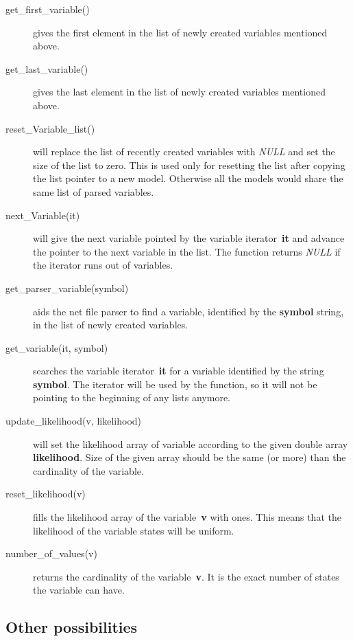 \documentclass[12pt,a4paper]{report}
\begin{document}
\begin{description}
\item[get_first_variable()] gives the first element in the list
of newly created variables mentioned above.

\item[get_last_variable()] gives the last element in the list
of newly created variables mentioned above.

\item[reset_Variable_list()] will replace the list of recently created
variables with {\it NULL} and set the size of the list to zero. This
is used only for resetting the list after copying the list pointer
to a new model. Otherwise all the models would share the same list of
parsed variables.

\item[next_Variable(it)] will give the next variable pointed by the
variable iterator~\textbf{it} and advance the pointer to the next
variable in the list. The function returns {\it NULL} if the iterator
runs out of variables.

\item[get_parser_variable(symbol)] aids the net file parser to find a
variable, identified by the \textbf{symbol} string, in the list of newly
created variables.

\item[get_variable(it, symbol)] searches the
variable iterator~\textbf{it} for a variable identified by the string
\textbf{symbol}. The iterator will be used by the function, so it will
not be pointing to the beginning of any lists anymore.

\item[update_likelihood(v, likelihood)] will set the likelihood array
of variable according to the given double array \textbf{likelihood}.
Size of the given array should be the same (or more) than the
cardinality of the variable.

\item[reset_likelihood(v)] fills the likelihood array of the
variable~\textbf{v} with ones. This means that the likelihood of the
variable states will be uniform.

\item[number_of_values(v)] returns the cardinality of the
variable~\textbf{v}. It is the exact number of states the variable can
have.
\end{description}


\subsection{Other possibilities}
\end{document}
